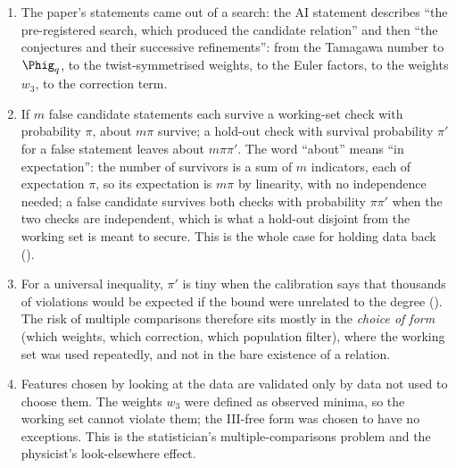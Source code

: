 \begin{sloppypar}
\begin{remark}\label{rem:computation:multiple-comparisons}
\begin{enumerate}[label=(\roman*)]
\item The paper's statements came out of a search: the AI statement describes ``the pre-registered search, which produced the candidate
relation'' and then ``the conjectures and their successive refinements'': from the Tamagawa number to $\Phig_q$, to the twist-symmetrised
weights, to the Euler factors, to the weights $w_3$, to the correction term.
\item If $m$ false candidate statements each survive a working-set check with probability $\pi$, about $m\pi$ survive; a hold-out check with
survival probability $\pi'$ for a false statement leaves about $m\pi\pi'$. The word ``about'' means ``in expectation'': the number of survivors is a
sum of $m$ indicators, each of expectation $\pi$, so its expectation is $m\pi$ by linearity, with no independence needed; a false candidate survives both
checks with probability $\pi\pi'$ when the two checks are independent, which is what a hold-out disjoint from the working set is meant to secure. This is
the whole case for holding data back ().
\item For a universal inequality, $\pi'$ is tiny when the calibration says that thousands of violations would be expected if the bound were
unrelated to the degree (). The risk of multiple comparisons therefore sits mostly in the \emph{choice of form}
(which weights, which correction, which population filter), where the working set was used repeatedly, and not in the bare existence of a
relation.
\item Features chosen by looking at the data are validated only by data not used to choose them. The weights $w_3$ were defined as observed
minima, so the working set cannot violate them; the III-free form was chosen to have no exceptions. This is the statistician's
multiple-comparisons problem \cite[chapter on multiple testing]{Wasserman04} and the physicist's look-elsewhere effect.
\end{enumerate}
\end{remark}


\end{sloppypar}
